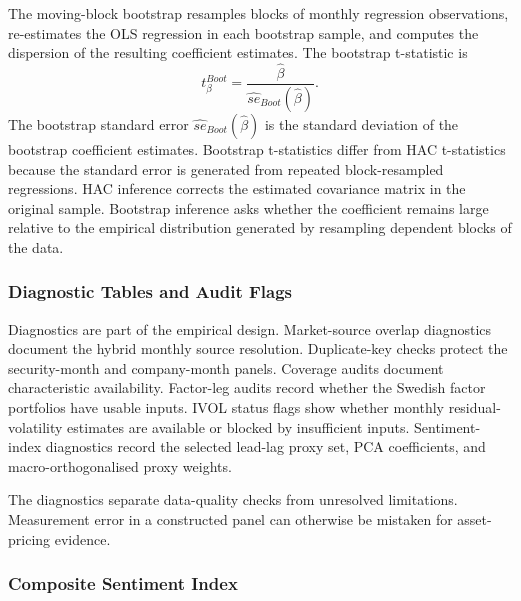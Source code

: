 \documentclass[11pt]{article}
\newcommand{\var}[1]{\ensuremath{#1}}
\begin{document}
The moving-block bootstrap resamples blocks of monthly regression observations, re-estimates the OLS regression in each bootstrap sample, and computes the dispersion of the resulting coefficient estimates. The bootstrap t-statistic is
\begin{equation}
    t^{Boot}_{\beta}
    =
    \frac{\hat{\beta}}{\widehat{se}_{Boot}(\hat{\beta})}.
\end{equation}
The bootstrap standard error \var{\widehat{se}_{Boot}(\hat{\beta})} is the standard deviation of the bootstrap coefficient estimates. Bootstrap t-statistics differ from HAC t-statistics because the standard error is generated from repeated block-resampled regressions. HAC inference corrects the estimated covariance matrix in the original sample. Bootstrap inference asks whether the coefficient remains large relative to the empirical distribution generated by resampling dependent blocks of the data.

\subsubsection{Diagnostic Tables and Audit Flags}
\label{app:diagnostic_audit_flags}

Diagnostics are part of the empirical design. Market-source overlap diagnostics document the hybrid monthly source resolution. Duplicate-key checks protect the security-month and company-month panels. Coverage audits document characteristic availability. Factor-leg audits record whether the Swedish factor portfolios have usable inputs. IVOL status flags show whether monthly residual-volatility estimates are available or blocked by insufficient inputs. Sentiment-index diagnostics record the selected lead-lag proxy set, PCA coefficients, and macro-orthogonalised proxy weights.

The diagnostics separate data-quality checks from unresolved limitations. Measurement error in a constructed panel can otherwise be mistaken for asset-pricing evidence.

\subsubsection{Composite Sentiment Index}
\end{document}
